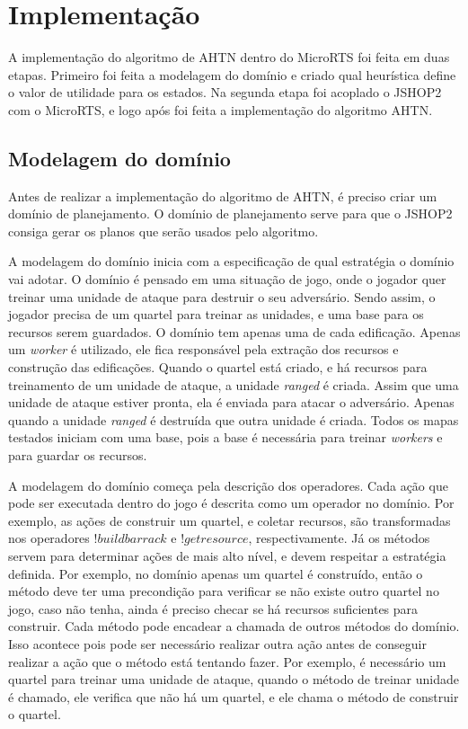 
\chapter{\label{chap:impl}Implementação}

A implementação do algoritmo de AHTN dentro do MicroRTS foi feita em duas etapas.
Primeiro foi feita a modelagem do domínio e criado qual heurística define o valor de utilidade para os estados.
Na segunda etapa foi acoplado o JSHOP2 com o MicroRTS, e logo após foi feita a implementação do algoritmo AHTN.

\section{Modelagem do domínio}

Antes de realizar a implementação do algoritmo de AHTN, é preciso criar um domínio de planejamento. 
O domínio de planejamento serve para que o JSHOP2 consiga gerar os planos que serão usados pelo algoritmo.

A modelagem do domínio inicia com a especificação de qual estratégia o domínio vai adotar.
O domínio é pensado em uma situação de jogo, onde o jogador quer treinar uma unidade de ataque para destruir o seu adversário.
Sendo assim, o jogador precisa de um quartel para treinar as unidades, e uma base para os recursos serem guardados.
O domínio tem apenas uma de cada edificação.
Apenas um \textit{worker} é utilizado, ele fica responsável pela extração dos recursos e construção das edificações.
Quando o quartel está criado, e há recursos para treinamento de um unidade de ataque, a unidade \textit{ranged} é criada.
Assim que uma unidade de ataque estiver pronta, ela é enviada para atacar o adversário.
Apenas quando a unidade \textit{ranged} é destruída que outra unidade é criada.
Todos os mapas testados iniciam com uma base, pois a base é necessária para treinar \textit{workers} e para guardar os recursos.  

A modelagem do domínio começa pela descrição dos operadores.
Cada ação que pode ser executada dentro do jogo é descrita como um operador no domínio.
Por exemplo, as ações de construir um quartel, e coletar recursos, são transformadas nos operadores $!buildbarrack$ e $!getresource$, respectivamente.
Já os métodos servem para determinar ações de mais alto nível, e devem respeitar a estratégia definida.
Por exemplo, no domínio apenas um quartel é construído, então o método deve ter uma precondição para verificar se não existe outro quartel no jogo, caso não tenha, ainda é preciso checar se há recursos suficientes para construir. 
Cada método pode encadear a chamada de outros métodos do domínio.
Isso acontece pois pode ser necessário realizar outra ação antes de conseguir realizar a ação que o método está tentando fazer.
Por exemplo, é necessário um quartel para treinar uma unidade de ataque, quando o método de treinar unidade é chamado, ele verifica que não há um quartel, e ele chama o método de construir o quartel.

